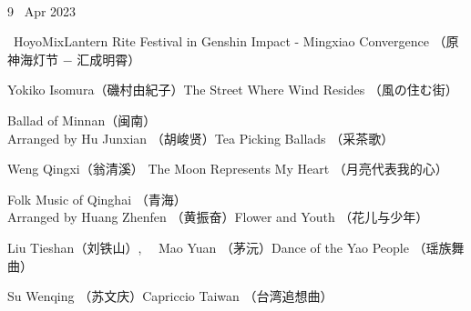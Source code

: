 \documentclass[letter,8pt,poets]{ConcProg}
\begin{document}
\begin{spacing}{1.0}
\begin{programme}{
\\  {\normalsize 9 ~Apr 2023}
}
\begin{part}[]
    
    
    \begin{composition}{\ HoyoMix}{}{Lantern Rite Festival in Genshin Impact - Mingxiao Convergence （原神海灯节 $-$ 汇成明霄）}{}      
    \end{composition} 
     \begin{composition}{Yokiko Isomura（磯村由紀子）}{}{The Street Where Wind Resides （風の住む街）}{}      
    \end{composition} 
    
     \begin{composition}{Ballad of Minnan（闽南）\\ Arranged by Hu Junxian （胡峻贤）}{}{Tea Picking Ballads （采茶歌）}{}      
    \end{composition} 
    
    \begin{composition}{Weng Qingxi（翁清溪） }{}{The Moon Represents My Heart （月亮代表我的心）}{}      
    \end{composition} 
    
    \begin{composition}{Folk Music of Qinghai	（青海） \\ Arranged by Huang Zhenfen （黄振奋）}{}{Flower and Youth （花儿与少年） }{}      
    \end{composition} 
    
    \begin{composition}{Liu Tieshan（刘铁山）, \ \ Mao Yuan （茅沅）}{}{Dance of the Yao People （瑶族舞曲）}{}      
    \end{composition} 
    
     \begin{composition}{Su Wenqing （苏文庆）}{}{Capriccio Taiwan （台湾追想曲）}{}      
    \end{composition} 
    
  \end{part}
  \newpage
\end{programme}


\begin{center}


\end{center}
\end{spacing}
\end{document}
